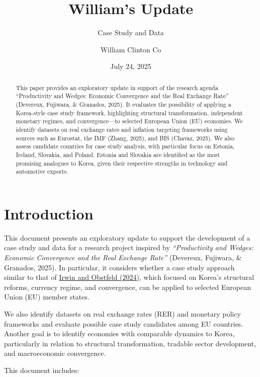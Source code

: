 \documentclass[
  11pt,
]{article}
\title{William's Update}
\subtitle{Case Study and Data}
\author{William Clinton Co}
\date{July 24, 2025}
\renewcommand*\contentsname{Table of contents}
\newcommand\contentsname{Table of contents}
\begin{document}
\maketitle
\begin{abstract}
This paper provides an exploratory update in support of the research
agenda ``Productivity and Wedges: Economic Convergence and the Real
Exchange Rate'' (Devereux, Fujiwara, \& Granados, 2025). It evaluates
the possibility of applying a Korea-style case study framework,
highlighting structural transformation, independent monetary regimes,
and convergence---to selected European Union (EU) economies. We identify
datasets on real exchange rates and inflation targeting frameworks using
sources such as Eurostat, the IMF (Zhang, 2025), and BIS (Chavaz, 2025).
We also assess candidate countries for case study analysis, with
particular focus on Estonia, Ireland, Slovakia, and Poland. Estonia and
Slovakia are identified as the most promising analogues to Korea, given
their respective strengths in technology and automotive exports.
\end{abstract}

\renewcommand*\contentsname{Table of contents}
{
\hypersetup{linkcolor=}
\setcounter{tocdepth}{3}
\tableofcontents
}

\section{Introduction}\label{introduction}

This document presents an exploratory update to support the development
of a case study and data for a research project inspired by
\emph{``Productivity and Wedges: Economic Convergence and the Real
Exchange Rate''} (Devereux, Fujiwara, \& Granados, 2025). In particular,
it considers whether a case study approach similar to that of
\href{https://www.nber.org/system/files/working_papers/w32769/w32769.pdf}{Irwin
and Obstfeld (2024)}, which focused on Korea's structural reforms,
currency regime, and convergence, can be applied to selected European
Union (EU) member states.

We also identify datasets on real exchange rates (RER) and monetary
policy frameworks and evaluate possible case study candidates among EU
countries. Another goal is to identify economies with comparable
dynamics to Korea, particularly in relation to structural
transformation, tradable sector development, and macroeconomic
convergence.

This document includes:
\end{document}
